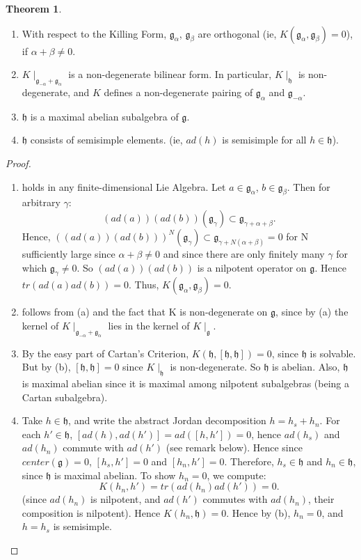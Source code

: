 \documentclass[12pt]{amsart}
\theoremstyle{definition}
\theoremstyle{definition}
\theoremstyle{definition}
\numberwithin{equation}{subsection}
\newcommand{\g}{\mathfrak{g}}
\newcommand{\h}{\mathfrak{h}}
\begin{document}
\setcounter{bigthmcount}{0}
\newtheorem{bigthm}[bigthmcount]{Theorem}
\begin{bigthm}\ 
\renewcommand{\labelenumi}{(\alph{enumi})}
\begin{enumerate}
\item With respect to the Killing Form, $\g_\alpha$, $\g_\beta$ are orthogonal
(ie, $K(\g_\alpha, \g_\beta) = 0$), if $\alpha + \beta \neq 0$.
\item $K\mid_{\g_{-\alpha} + \g_{\alpha}}$ is a non-degenerate bilinear form. In particular,
$K\mid_\h$ is non-degenerate, and $K$ defines a non-degenerate pairing of $\g_\alpha$ and $\g_{-\alpha}$.
\item $\h$ is a maximal abelian subalgebra of $\g$.
\item $\h$ consists of semisimple elements. (ie, $ad(h)$ is semisimple for all $h \in \h$).
\end{enumerate}
\end{bigthm}
\begin{proof}\ 
\renewcommand{\labelenumi}{(\alph{enumi})}
\begin{enumerate}
\item holds in any finite-dimensional Lie Algebra. Let $a \in \g_\alpha$, $b \in \g_\beta$. Then
for arbitrary $\gamma$:
$$(ad(a))(ad(b))(\g_\gamma) \subset \g_{\gamma + \alpha + \beta}.$$
Hence, $((ad(a))(ad(b)))^N (\g_\gamma) \subset \g_{\gamma + N(\alpha + \beta)} = 0$ for N sufficiently large
since $\alpha + \beta \neq 0$ and since there are only finitely many $\gamma$ for which $\g_\gamma \neq 0$. So
$(ad(a))(ad(b))$ is a nilpotent operator on $\g$. Hence $tr(ad(a) ad(b)) = 0$. Thus, $K(\g_\alpha, \g_\beta) = 0$.

\item follows from (a) and the fact that K is non-degenerate on $\g$, since by (a) the kernel of
$K\mid_{\g_{-\alpha} + \g_{\alpha}}$ lies in the kernel of $K\mid_{\g}$.

\item By the easy part of Cartan's Criterion, $K(\h, [\h, \h]) = 0$, since $\h$ is solvable. But by
(b), $[\h, \h] = 0$ since $K\mid_{\h}$ is non-degenerate. So $\h$ is abelian. Also, $\h$
is maximal abelian since it is maximal among nilpotent subalgebras (being a Cartan subalgebra).

\item Take $h \in \h$, and write the abstract Jordan decomposition $h = h_s + h_n$.
For each $h' \in \h$, $[ad(h), ad(h')] = ad([h,h']) = 0$, hence
$ad(h_s)$ and $ad(h_n)$ commute with $ad(h')$ (see remark below). Hence since $center(\g) = 0$, 
$[h_s,h'] = 0$ and $[h_n, h'] = 0$. Therefore, $h_s \in \h$ and $h_n \in \h$, since
$\h$ is maximal abelian. To show $h_n = 0$, we compute:
$$K(h_n, h') = tr(ad(h_n) ad(h')) = 0.$$
(since $ad(h_n)$ is nilpotent, and $ad(h')$ commutes with $ad(h_n)$, their composition is nilpotent).
Hence $K(h_n, \h) = 0$. Hence by (b), $h_n = 0$, and $h = h_s$ is semisimple.
\end{enumerate}
\end{proof}
\end{document}
